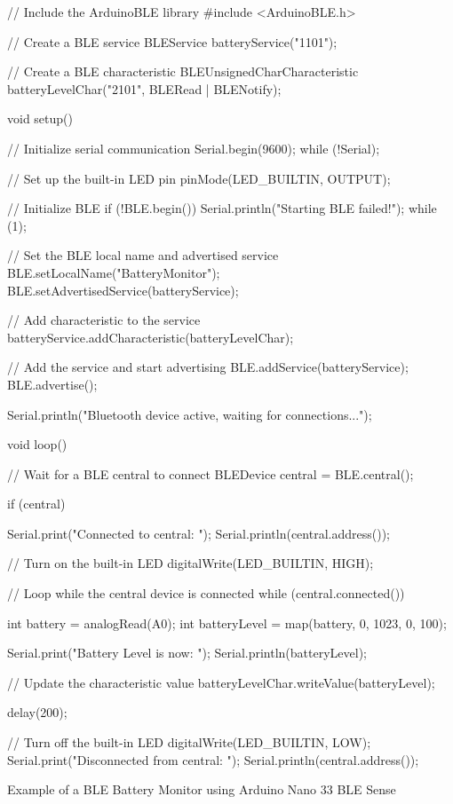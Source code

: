 \begin{code}
	\begin{Arduino}
		// Include the ArduinoBLE library
		#include <ArduinoBLE.h>
		
		// Create a BLE service
		BLEService batteryService("1101");
		
		// Create a BLE characteristic
		BLEUnsignedCharCharacteristic batteryLevelChar("2101", BLERead | BLENotify);
		
		void setup() {
			// Initialize serial communication
			Serial.begin(9600);
			while (!Serial);
			
			// Set up the built-in LED pin
			pinMode(LED_BUILTIN, OUTPUT);
			
			// Initialize BLE
			if (!BLE.begin()) {
				Serial.println("Starting BLE failed!");
				while (1);
			}
			
			// Set the BLE local name and advertised service
			BLE.setLocalName("BatteryMonitor");
			BLE.setAdvertisedService(batteryService);
			
			// Add characteristic to the service
			batteryService.addCharacteristic(batteryLevelChar);
			
			// Add the service and start advertising
			BLE.addService(batteryService);
			BLE.advertise();
			
			Serial.println("Bluetooth device active, waiting for connections...");
		}
		
		void loop() {
			// Wait for a BLE central to connect
			BLEDevice central = BLE.central();
			
			if (central) {
				Serial.print("Connected to central: ");
				Serial.println(central.address());
				
				// Turn on the built-in LED
				digitalWrite(LED_BUILTIN, HIGH);
				
				// Loop while the central device is connected
				while (central.connected()) {
					int battery = analogRead(A0);
					int batteryLevel = map(battery, 0, 1023, 0, 100);
					
					Serial.print("Battery Level is now: ");
					Serial.println(batteryLevel);
					
					// Update the characteristic value
					batteryLevelChar.writeValue(batteryLevel);
					
					delay(200);
				}
				
				// Turn off the built-in LED
				digitalWrite(LED_BUILTIN, LOW);
				Serial.print("Disconnected from central: ");
				Serial.println(central.address());
			}
		}
	\end{Arduino}
	\caption{Example of a BLE Battery Monitor using Arduino Nano 33 BLE Sense}\label{code:battery-monitor}
\end{code}

